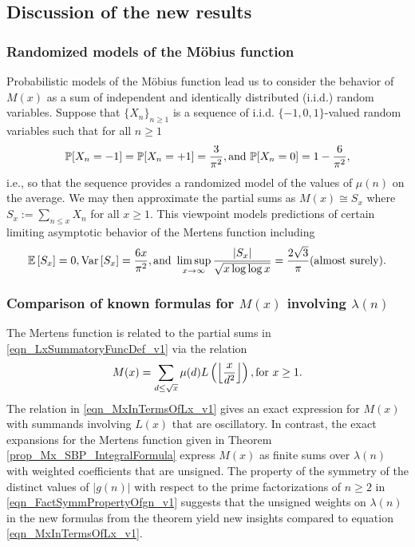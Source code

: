 \documentclass[11pt,reqno,a4letter]{article}
\newcommand{\hlocalref}[1]{\hyperref[#1]{\ref{#1}}}
\numberwithin{equation}{section}
\numberwithin{figure}{section}
\numberwithin{table}{section}
\newcommand{\Floor}[2]{\ensuremath{\left\lfloor \frac{#1}{#2} \right\rfloor}}
\theoremstyle{plain}
\numberwithin{theorem}{section}
\theoremstyle{definition}
\theoremstyle{remark}
\newcommand{\mathtext}[1]{\text{\rm #1}}
\begin{document}
\subsection{Discussion of the new results}

\subsubsection{Randomized models of the M\"obius function}

Probabilistic models of the M\"obius function lead us to consider the behavior of $M(x)$ 
as a sum of independent and identically distributed (i.i.d.) random variables. 
Suppose that $\{X_n\}_{n \geq 1}$ is a sequence of i.i.d. 
$\{-1,0,1\}$-valued random variables 
such that for all $n \geq 1$ 
$$\mathbb{P}[X_n = -1] = \mathbb{P}[X_n = +1] = \frac{3}{\pi^2}, 
  \mathtext{ and } \mathbb{P}[X_n = 0] = 1 - \frac{6}{\pi^2},$$ 
i.e., so that the sequence provides a randomized model of the values of $\mu(n)$ on the average. 
We may then approximate the partial sums as 
$M(x) \cong S_x$ where $S_x := \sum_{n \leq x} X_n$ for all $x \geq 1$. 
This viewpoint models predictions of certain limiting asymptotic behavior of the 
Mertens function including \cite[Thm.~9.4; \S 9]{BILLINGSLY-PROB-AND-MEASURE-BOOK}
\[
\mathbb{E}\left[S_x\right] = 0, 
     \operatorname{Var}\left[S_x\right] = \frac{6x}{\pi^2}, 
     \mathtext{ and } 
     \limsup_{x \rightarrow \infty} \frac{\left\lvert S_x\right\rvert}{\sqrt{x \log\log x}} = 
     \frac{2\sqrt{3}}{\pi} \mathtext{ (almost surely).} 
\]

\subsubsection{Comparison of known formulas for $M(x)$ involving $\lambda(n)$}

The Mertens function is related to the partial sums in 
\eqref{eqn_LxSummatoryFuncDef_v1} 
via the relation \cite{HUMPHRIES-JNT-2013,LEHMAN-1960} 
\begin{equation}
\label{eqn_MxInTermsOfLx_v1} 
M(x) = \sum_{d \leq \sqrt{x}} \mu(d) L\left(\Floor{x}{d^2}\right), \mathtext{ for } x \geq 1.
\end{equation}
The relation in \eqref{eqn_MxInTermsOfLx_v1} 
gives an exact expression for $M(x)$ with summands involving $L(x)$ that are oscillatory. 
In contrast, the exact expansions for the Mertens function given in 
Theorem \hlocalref{prop_Mx_SBP_IntegralFormula} 
express $M(x)$ as finite sums over $\lambda(n)$ with weighted coefficients that are unsigned. 
The property of the symmetry of the distinct values of $|g(n)|$ with respect to the 
prime factorizations of $n \geq 2$ in \eqref{eqn_FactSymmPropertyOfgn_v1} 
suggests that the unsigned weights on $\lambda(n)$ in 
the new formulas from the theorem yield new insights compared to 
equation \eqref{eqn_MxInTermsOfLx_v1}. 
\end{document}

